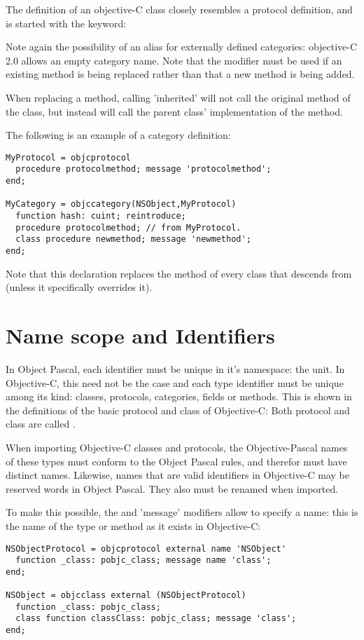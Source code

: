 The definition of an objective-C class closely resembles a protocol
definition, and is started with the  keyword:

Note again the possibility of an alias for externally defined categories:
objective-C 2.0 allows an empty category name. Note that the
 modifier must be used if an existing method is being replaced
rather than that a new method is being added.

When replacing a method, calling 'inherited' will not call the original
method of the class, but instead will call the parent class' implementation
of the method. 

The following is an example of a category definition:
\begin{verbatim}
MyProtocol = objcprotocol
  procedure protocolmethod; message 'protocolmethod';
end;
 
MyCategory = objccategory(NSObject,MyProtocol)
  function hash: cuint; reintroduce;
  procedure protocolmethod; // from MyProtocol.
  class procedure newmethod; message 'newmethod';
end;
\end{verbatim}
Note that this declaration replaces the  method of every class
that descends from  (unless it specifically overrides it).

\section{Name scope and Identifiers}
In Object Pascal, each identifier must be unique in it's namespace: the unit. 
In Objective-C, this need not be the case and each type identifier must be
unique among its kind: classes, protocols, categories, fields or methods.
This is shown in the definitions of the basic protocol and class of
Objective-C: Both protocol and class are called .

When importing Objective-C classes and protocols, the Objective-Pascal 
names of these types must conform to the Object Pascal rules, and therefor 
must have distinct names. Likewise, names that are valid identifiers in
Objective-C may be reserved words in Object Pascal. They also must be
renamed when imported.

To make this possible, the  and 'message' modifiers allow 
to specify a name: this is the name of the type or method as it exists 
in Objective-C:
\begin{verbatim}
NSObjectProtocol = objcprotocol external name 'NSObject' 
  function _class: pobjc_class; message name 'class';
end;
 
NSObject = objcclass external (NSObjectProtocol) 
  function _class: pobjc_class; 
  class function classClass: pobjc_class; message 'class';
end;
\end{verbatim}

